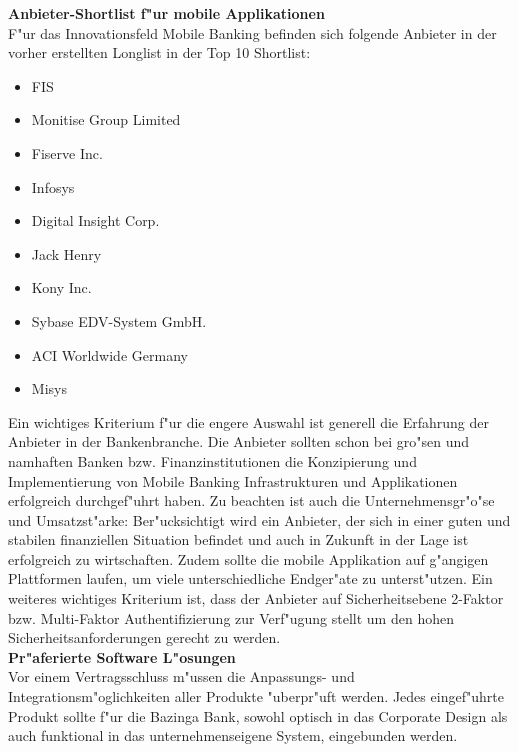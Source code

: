 \textbf{Anbieter-Shortlist f"ur mobile Applikationen}\\
F"ur das Innovationsfeld Mobile Banking befinden sich folgende Anbieter in der vorher erstellten Longlist in der Top 10 Shortlist:

\begin{itemize}
	\item FIS
	\item Monitise Group Limited
	\item Fiserve Inc.
	\item Infosys
	\item Digital Insight Corp.
	\item Jack Henry
	\item Kony Inc.
	\item Sybase EDV-System GmbH.
	\item ACI Worldwide Germany
	\item Misys
\end{itemize}

Ein wichtiges Kriterium f"ur die engere Auswahl ist generell die Erfahrung der Anbieter in der Bankenbranche. Die Anbieter sollten schon bei gro"sen und namhaften Banken bzw. Finanzinstitutionen die Konzipierung und Implementierung von Mobile Banking Infrastrukturen und Applikationen erfolgreich durchgef"uhrt haben. Zu beachten ist auch die Unternehmensgr"o"se und Umsatzst"arke: Ber"ucksichtigt wird ein Anbieter, der sich in einer guten und stabilen finanziellen Situation befindet und auch in Zukunft in der Lage ist erfolgreich zu wirtschaften. Zudem sollte die mobile Applikation auf g"angigen Plattformen laufen, um viele unterschiedliche Endger"ate zu unterst"utzen. Ein weiteres wichtiges Kriterium ist, dass der Anbieter auf Sicherheitsebene 2-Faktor bzw. Multi-Faktor Authentifizierung zur Verf"ugung stellt um den hohen Sicherheitsanforderungen gerecht zu werden.\\

\textbf{Pr"aferierte Software L"osungen}\\
Vor einem Vertragsschluss m"ussen die Anpassungs- und Integrationsm"oglichkeiten aller Produkte "uberpr"uft werden. Jedes eingef"uhrte Produkt sollte f"ur die Bazinga Bank, sowohl optisch in das Corporate Design als auch funktional in das unternehmenseigene System, eingebunden werden.

